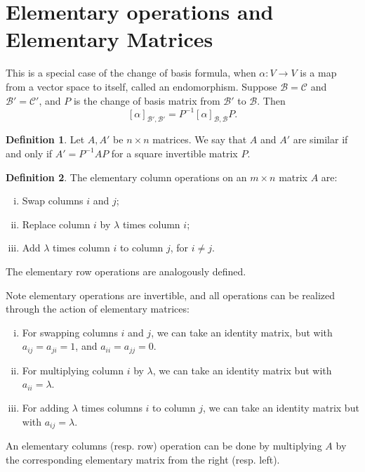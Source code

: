 \documentclass[12pt]{article}
\theoremstyle{definition}
\newtheorem{definition}{Definition}[section]
\theoremstyle{remark}
\begin{document}
\newpage

\section{Elementary operations and Elementary Matrices}%
\label{sec:elementary_operations_and_elementary_matrices}

This is a special case of the change of basis formula, when $\alpha : V \to V$ is a map from a vector space to itself, called an endomorphism. Suppose $\mathcal{B} = \mathcal{C}$ and $\mathcal{B}' = \mathcal{C}'$, and $P$ is the change of basis matrix from $\mathcal{B}'$ to $\mathcal{B}$. Then
\[
	[\alpha]_{\mathcal{B'},  \mathcal{B}'} = P^{-1} [\alpha]_{\mathcal{B}, \mathcal{B}} P
.\]

\begin{definition}
	Let $A, A'$ be $n \times n$ matrices. We say that $A$ and $A'$ are similar if and only if $A' = P^{-1}AP$ for a square invertible matrix $P$.
\end{definition}

\begin{definition}
	The elementary column operations on an $m \times n$ matrix $A$ are:
	\begin{enumerate}[(i)]
		\item Swap columns $i$ and $j$;
		\item Replace column $i$ by $\lambda$ times column $i$;
		\item Add $\lambda$ times column $i$ to column $j$, for $i \neq j$.
	\end{enumerate}
	The elementary row operations are analogously defined.
\end{definition}

Note elementary operations are invertible, and all operations can be realized through the action of elementary matrices:
\begin{enumerate}[(i)]
	\item For swapping columns $i$ and $j$, we can take an identity matrix, but with $a_{ij} = a_{ji} = 1$, and $a_{ii} = a_{jj} = 0$.
	\item For multiplying column $i$ by $\lambda$, we can take an identity matrix but with $a_{ii} = \lambda$.
	\item For adding $\lambda$ times columns $i$ to column $j$, we can take an identity matrix but with $a_{ij} = \lambda$.
\end{enumerate}
An elementary columns (resp. row) operation can be done by multiplying $A$ by the corresponding elementary matrix from the right (resp. left).
\end{document}
